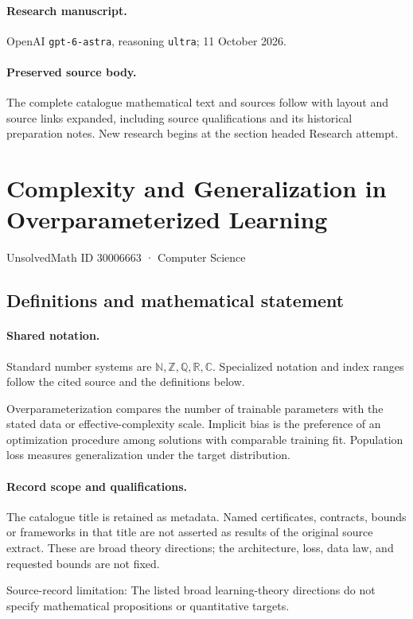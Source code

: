 \documentclass[11pt]{article}
\begin{document}
\paragraph{Research manuscript.} OpenAI \texttt{gpt-6-astra}, reasoning \texttt{ultra}; 11 October 2026.
\paragraph{Preserved source body.} The complete catalogue mathematical text and sources follow with layout and source links expanded, including source qualifications and its historical preparation notes. New research begins at the section headed Research attempt.

\section{Complexity and Generalization in Overparameterized Learning}\label{30006663}
{\small UnsolvedMath ID 30006663 · Computer Science}
\subsection{Definitions and mathematical statement}

\paragraph{Shared notation.}Standard number systems are $\mathbb N,\mathbb Z,\mathbb Q,\mathbb R,\mathbb C$. Specialized notation and index ranges follow the cited source and the definitions below.


Overparameterization compares the number of trainable parameters with the stated data or effective-complexity scale. Implicit bias is the preference of an optimization procedure among solutions with comparable training fit. Population loss measures generalization under the target distribution.
\paragraph{Record scope and qualifications.}
The catalogue title is retained as metadata. Named certificates, contracts, bounds or frameworks in that title are not asserted as results of the original source extract.
These are broad theory directions; the architecture, loss, data law, and requested bounds are not fixed.

Source-record limitation: The listed broad learning-theory directions do not specify mathematical propositions or quantitative targets.
\end{document}
